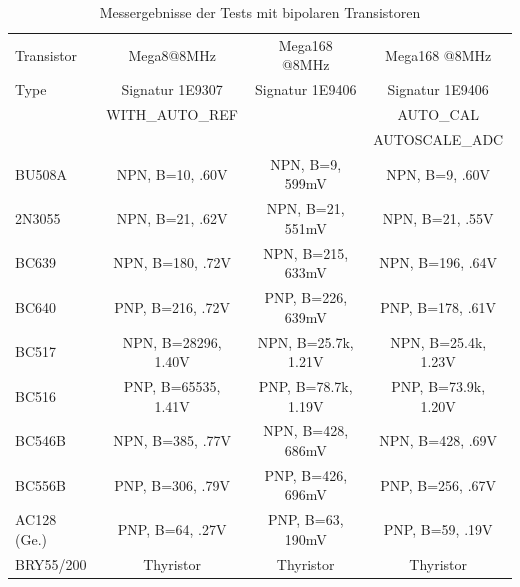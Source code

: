 \begin{table}[H]
  \begin{center}
    \begin{tabular}{| l | c | c | c |}
    \hline
 Transistor & Mega8@8MHz          & Mega168 @8MHz       & Mega168 @8MHz    \\
    Type    & Signatur 1E9307     & Signatur 1E9406     & Signatur 1E9406  \\
            & WITH\_AUTO\_REF     &                     & AUTO\_CAL        \\
            &                     &                     & AUTOSCALE\_ADC   \\
    \hline
    \hline
BU508A      & NPN, B=10, .60V     & NPN, B=9, 599mV     & NPN, B=9, .60V   \\
    \hline
2N3055      & NPN, B=21, .62V     & NPN, B=21, 551mV    & NPN, B=21, .55V  \\
    \hline
BC639       & NPN, B=180, .72V    & NPN, B=215, 633mV   & NPN, B=196, .64V \\
    \hline
BC640       & PNP, B=216, .72V    & PNP, B=226, 639mV   & PNP, B=178, .61V \\
    \hline
BC517       & NPN, B=28296, 1.40V & NPN, B=25.7k, 1.21V & NPN, B=25.4k, 1.23V\\
    \hline
BC516       & PNP, B=65535, 1.41V & PNP, B=78.7k, 1.19V & PNP, B=73.9k, 1.20V\\
    \hline
BC546B      & NPN, B=385, .77V    & NPN, B=428, 686mV   & NPN, B=428, .69V \\
    \hline
BC556B      & PNP, B=306, .79V    & PNP, B=426, 696mV   & PNP, B=256, .67V \\

    \hline
AC128 (Ge.) & PNP, B=64, .27V     & PNP, B=63, 190mV    & PNP, B=59, .19V  \\
    \hline
BRY55/200   & Thyristor           & Thyristor           & Thyristor        \\
    \hline
    \end{tabular}
  \end{center}
  \caption{Messergebnisse der Tests mit bipolaren Transistoren}
  \label{tab:bipolar} 
\end{table}

